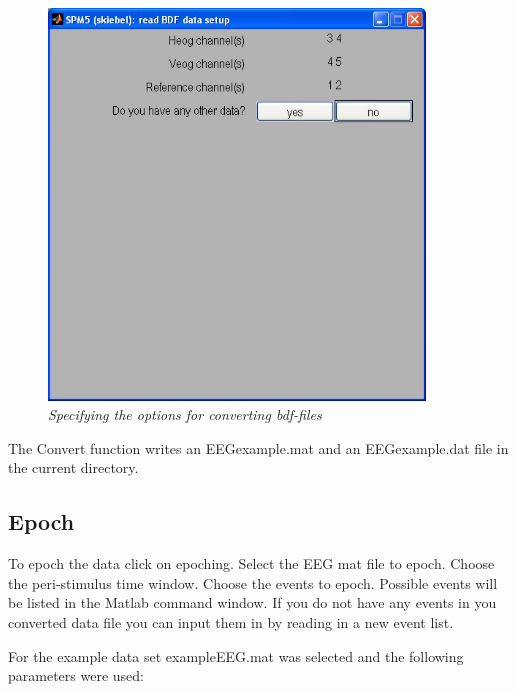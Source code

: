 \begin{figure}
\begin{center}
\includegraphics[width=100mm]{meeg/tutorial1}
\end{center}
\caption{\em Specifying the options for converting bdf-files} 
\end{figure}

The Convert function writes an EEGexample.mat and an EEGexample.dat
file in the current directory.

\subsection{Epoch}
To epoch the data click on epoching. Select the EEG mat file to
epoch. Choose the peri-stimulus time window. Choose the events to
epoch. Possible events will be listed in the Matlab command window. If
you do not have any events in you converted data file you can input
them in by reading in a new event list.

For the example data set exampleEEG.mat was selected and the following
parameters were used:

